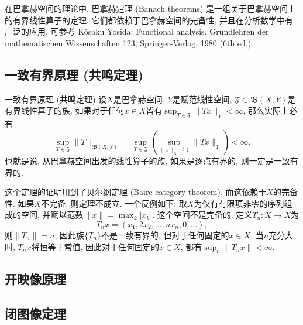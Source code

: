 
在巴拿赫空间的理论中, 巴拿赫定理 (Banach theorems) 是一组关于巴拿赫空间上的有界线性算子的定理. 它们都依赖于巴拿赫空间的完备性, 并且在分析数学中有广泛的应用. 可参考 Kôsaku Yosida: Functional analysis. Grundlehren der mathematischen Wissenschaften 123, Springer-Verlag, 1980 (6th ed.).

\subsection{一致有界原理 (共鸣定理)}
\begin{theorem}{一致有界原理 (共鸣定理)}
设$X$是巴拿赫空间, $Y$是赋范线性空间, $\mathfrak{F}\subset\mathfrak{B}(X,Y)$是有界线性算子的族. 如果对于任何$x\in X$皆有$\sup_{T\in\mathfrak{F}}\|Tx\|_Y<\infty$, 那么实际上必有
$$
\sup_{T\in\mathfrak{F}}\|T\|_{\mathfrak{B}(X,Y)}
=\sup_{T\in\mathfrak{F}}\left(\sup_{\|x\|_X\leq 1}\|Tx\|_Y\right)<\infty.
$$
也就是说, 从巴拿赫空间出发的线性算子的族, 如果是逐点有界的, 则一定是一致有界的. 
\end{theorem}
这个定理的证明用到了贝尔纲定理 (Baire category theorem), 而这依赖于$X$的完备性. 如果$X$不完备, 则定理不成立. 一个反例如下: 取$X$为仅有有限项非零的序列组成的空间, 并赋以范数$\|x\|=\max_{k}|x_k|$. 这个空间不是完备的. 定义$T_n:X\to X$为
$$
T_nx=(x_1,2x_2,...,nx_n,0,...),
$$
则$\|T_n\|=n$, 因此族$\{T_n\}$不是一致有界的, 但对于任何固定的$x\in X$, 当$n$充分大时, $T_nx$将恒等于常值, 因此对于任何固定的$x\in X$, 都有$\sup_n\|T_nx\|<\infty$.

\subsection{开映像原理}

\subsection{闭图像定理}